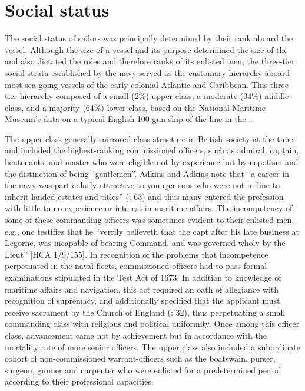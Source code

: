 \section{{Social status}}\label{sec:3.7}

  The social status of sailors was principally determined by their rank aboard the vessel. Although the size of a vessel and its purpose determined the size of the  and also dictated the roles and therefore ranks of its enlisted men, the three-tier social strata established by the navy served as the customary hierarchy aboard most sea-going vessels of the early colonial Atlantic and Caribbean. This three-tier hierarchy composed of a small (2\%) upper class, a moderate (34\%) middle class, and a majority (64\%) lower class, based on the National Maritime Museum’s data on a typical English 100-gun ship of the line in the . 

The upper class generally mirrored class structure in British society at the time and included the highest-ranking commissioned officers, such as admiral, captain, lieutenants, and master who were eligible not by experience but by nepotism and the distinction of being “gentlemen”. Adkins and Adkins note that “a career in the navy was particularly attractive to younger sons who were not in line to inherit landed estates and titles” (\citeyear*{AdkinsAdkins2008}: 63) and thus many entered the profession with little-to-no experience or interest in maritime affairs. The incompetency of some of these commanding officers was sometimes evident to their enlisted men, e.g., one  testifies that he “verrily believeth that the capt after his late business at Legorne, was incapable of bearing Command, and was governed wholy by the Lieut” [HCA 1/9/155]. In recognition of the problems that incompetence perpetuated in the naval fleets, commissioned officers had to pass formal examinations stipulated in the Test Act of 1673. In addition to knowledge of maritime affairs and navigation, this act required an oath of allegiance with recognition of supremacy, and additionally specified that the applicant must receive sacrament by the Church of England (\citealt{AdkinsAdkins2008}: 32), thus perpetuating a small commanding class with religious and political uniformity. Once among this officer class, advancement came not by achievement but in accordance with the mortality rate of more senior officers. The upper class also included a subordinate cohort of non-commissioned warrant-officers such as the boatswain, purser, surgeon, gunner and carpenter who were enlisted for a predetermined period according to their professional capacities.  

